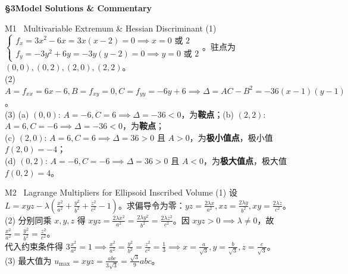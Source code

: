 \documentclass[a4paper,11pt]{article}
\begin{document}
\clearpage

{\Large\sffamily\bfseries\color{navy} \S 3\quad Model Solutions \& Commentary}

\vspace{2pt}

\begin{solution}{M1 \textperiodcentered\ Multivariable Extremum \& Hessian Discriminant}
(1) $\begin{cases} f_x = 3x^2 - 6x = 3x(x-2) = 0 \implies x=0 \text{ 或 } 2 \\ f_y = -3y^2 + 6y = -3y(y-2) = 0 \implies y=0 \text{ 或 } 2 \end{cases}$。驻点为 $(0,0), (0,2), (2,0), (2,2)$。\\
(2) $A = f_{xx} = 6x-6, B = f_{xy} = 0, C = f_{yy} = -6y+6 \implies \Delta = AC - B^2 = -36(x-1)(y-1)$。\\
(3) (a) $(0,0)$: $A=-6, C=6 \implies \Delta = -36 < 0$，为\textbf{鞍点}；(b) $(2,2)$: $A=6, C=-6 \implies \Delta = -36 < 0$，为\textbf{鞍点}；\\
(c) $(2,0)$: $A=6, C=6 \implies \Delta = 36 > 0$ 且 $A>0$，为\textbf{极小值点}，极小值 $f(2,0) = -4$；\\
(d) $(0,2)$: $A=-6, C=-6 \implies \Delta = 36 > 0$ 且 $A<0$，为\textbf{极大值点}，极大值 $f(0,2) = 4$。
\end{solution}

\vspace{1.5pt}

\begin{solution}{M2 \textperiodcentered\ Lagrange Multipliers for Ellipsoid Inscribed Volume}
(1) 设 $L = xyz - \lambda (\frac{x^2}{a^2} + \frac{y^2}{b^2} + \frac{z^2}{c^2} - 1)$。求偏导令为零：$yz = \frac{2\lambda x}{a^2}, xz = \frac{2\lambda y}{b^2}, xy = \frac{2\lambda z}{c^2}$。\\
(2) 分别同乘 $x, y, z$ 得 $xyz = \frac{2\lambda x^2}{a^2} = \frac{2\lambda y^2}{b^2} = \frac{2\lambda z^2}{c^2}$。因 $xyz>0 \implies \lambda \neq 0$，故 $\frac{x^2}{a^2} = \frac{y^2}{b^2} = \frac{z^2}{c^2}$。\\
代入约束条件得 $3\frac{x^2}{a^2} = 1 \implies \frac{x^2}{a^2} = \frac{y^2}{b^2} = \frac{z^2}{c^2} = \frac{1}{3} \implies x = \frac{a}{\sqrt{3}}, y = \frac{b}{\sqrt{3}}, z = \frac{c}{\sqrt{3}}$。\\
(3) 最大值为 $u_{\max} = xyz = \frac{abc}{3\sqrt{3}} = \frac{\sqrt{3}}{9}abc$。
\end{solution}
\end{document}

